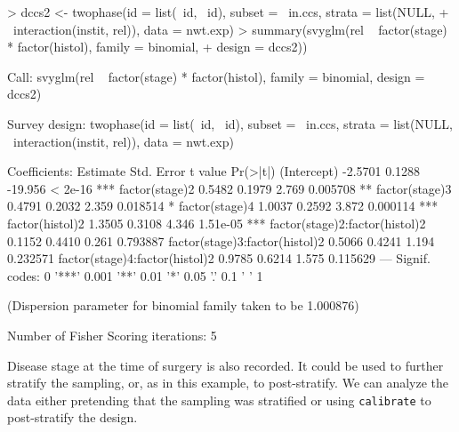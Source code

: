 \documentclass{article}
\begin{document}
\begin{Schunk}
\begin{Sinput}
> dccs2 <- twophase(id = list(~id, ~id), subset = ~in.ccs, strata = list(NULL, 
+     ~interaction(instit, rel)), data = nwt.exp)
> summary(svyglm(rel ~ factor(stage) * factor(histol), family = binomial, 
+     design = dccs2))
\end{Sinput}
\begin{Soutput}
Call:
svyglm(rel ~ factor(stage) * factor(histol), family = binomial, 
    design = dccs2)

Survey design:
twophase(id = list(~id, ~id), subset = ~in.ccs, strata = list(NULL, 
    ~interaction(instit, rel)), data = nwt.exp)

Coefficients:
                               Estimate Std. Error t value Pr(>|t|)    
(Intercept)                     -2.5701     0.1288 -19.956  < 2e-16 ***
factor(stage)2                   0.5482     0.1979   2.769 0.005708 ** 
factor(stage)3                   0.4791     0.2032   2.359 0.018514 *  
factor(stage)4                   1.0037     0.2592   3.872 0.000114 ***
factor(histol)2                  1.3505     0.3108   4.346 1.51e-05 ***
factor(stage)2:factor(histol)2   0.1152     0.4410   0.261 0.793887    
factor(stage)3:factor(histol)2   0.5066     0.4241   1.194 0.232571    
factor(stage)4:factor(histol)2   0.9785     0.6214   1.575 0.115629    
---
Signif. codes:  0 '***' 0.001 '**' 0.01 '*' 0.05 '.' 0.1 ' ' 1 

(Dispersion parameter for binomial family taken to be 1.000876)

Number of Fisher Scoring iterations: 5
\end{Soutput}
\end{Schunk}

Disease stage at the time of surgery is also recorded. It could be
used to further stratify the sampling, or, as in this example, to
post-stratify.  We can analyze the data either pretending that the
sampling was stratified or using \texttt{calibrate} to post-stratify
the design.
\end{document}
